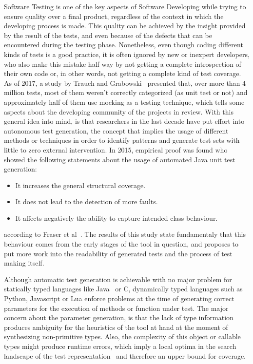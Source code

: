 \documentclass[%
  chapterprefix=false,%
  open=right,%
  twoside=true,%
  paper=a4,%
  logofile={Figures/logo.png},%
  thesistype=master,%
  UKenglish,%
]{se2thesis}
\begin{document}
Software Testing is one of the key aspects of Software Developing while trying to ensure quality over a final product, regardless of the context in which the developing process is made.
This quality can be achieved by the insight provided by the result of the tests, and even because of the defects that can be encountered during the testing phase.
Nonetheless, even though coding different kinds of tests is a good practice, it is often ignored by new or inexpert developers, who also make this mistake half way by not getting a complete introspection of their own code or, in other words, not getting a complete kind of test coverage.
As of 2017, a study by Trauch and Grabowski~\cite{DBLP:conf/icst/TrautschG17} presented that, over more than 4 million tests, most of them weren't correctly categorized (as unit test or not) and approximately half of them use mocking as a testing technique, which tells some aspects about the developing community of the projects in review. 
With this general idea into mind, is that researchers in the last decade   have put effort into autonomous test generation, the concept that implies the usage of different methods or techniques in order to identify patterns and generate test sets with little to zero   external intervention.
In 2015, empirical proof was found who showed the following statements about the usage of automated Java unit test generation:
\begin{itemize}
  \item It increases the general structural coverage.
  \item It does not lead to the detection of more faults.
  \item It affects negatively the ability to capture intended class behaviour.
\end{itemize}
according to Fraser et al~\cite{DBLP:journals/tosem/FraserSMAP15}.
The results of this study state fundamentaly that this behaviour  comes from the early stages of the tool in question, and proposes to put more work into the readability of generated tests and  the process of test making itself.

Although automatic test generation is achievable with no major problem for statically typed languages like Java~\cite{DBLP:journals/tse/FraserA13} or C, dynamically typed languages such as Python, Javascript or Lua enforce problems at the time of generating correct parameters for the execution of methods or function under test.
The major concern about the parameter generation, is that the lack of type information produces ambiguity for the heuristics of the tool at hand at the moment of synthesizing non-primitive types.
Also, the complexity of this object or callable types might produce runtime errors, which imply a local optima in the search landscape of the test representation~\cite{DBLP:conf/sigsoft/0001O00D21} and therefore an upper bound for coverage.
\end{document}
